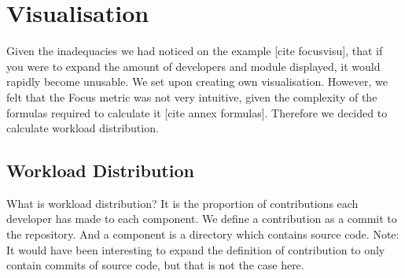 \section{Visualisation}

Given the inadequacies we had noticed on the example [cite focusvisu], that if you were to expand the amount of developers and module displayed, it would rapidly become unusable. We set upon creating own visualisation.
However, we felt that the Focus metric was not very intuitive, given the complexity of the formulas required to calculate it [cite annex formulas]. Therefore we decided to calculate workload distribution.

\subsection{Workload Distribution}

What is workload distribution?
It is the proportion of contributions each developer has made to each component.
We define a contribution as a commit to the repository.
And a component is a directory which contains source code.
Note: It would have been interesting to expand the definition of contribution to only contain commits of source code, but that is not the case here.\\

